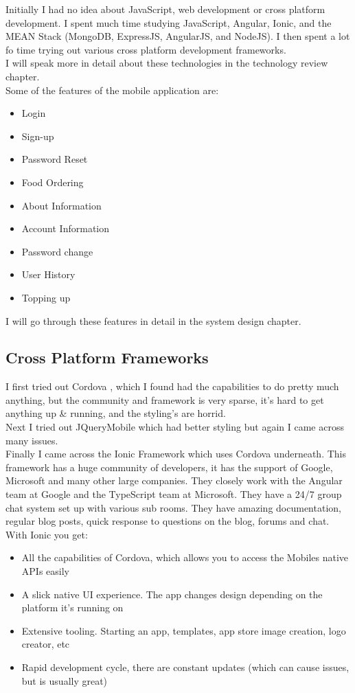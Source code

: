 Initially I had no idea about JavaScript, web development or cross platform development. I spent much time studying JavaScript, Angular, Ionic, and the MEAN Stack (MongoDB, ExpressJS, AngularJS, and NodeJS). I then spent a lot fo time trying out various cross platform development frameworks.
\\

I will speak more in detail about these technologies in the technology review chapter.
\\

Some of the features of the mobile application are:
\begin{itemize}
\item Login
\item Sign-up
\item Password Reset
\item Food Ordering
\item About Information
\item Account Information
\item Password change
\item User History
\item Topping up
\end{itemize}
I will go through these features in detail in the system design chapter.

\subsection{Cross Platform Frameworks}
I first tried out Cordova \cite{cordova}, which I found had the capabilities to do pretty much anything, but the community and framework is very sparse, it's hard to get anything up \& running, and the styling's are horrid.
\\

Next I tried out JQueryMobile \cite{jquery_mobile} which had better styling but again I came across many issues.
\\

Finally I came across the Ionic Framework \cite{ionic} which uses Cordova underneath. This framework has a huge community of developers, it has the support of Google, Microsoft and many other large companies. They closely work with the Angular team at Google and the TypeScript team at Microsoft. 
They have a 24/7 group chat system set up with various sub rooms. 
They have amazing documentation, regular blog posts, quick response to questions on the blog, forums and chat. 
With Ionic you get:
\begin{itemize}
\item All the capabilities of Cordova, which allows you to access the Mobiles native APIs easily
\item A slick native UI experience. The app changes design depending on the platform it's running on
\item Extensive tooling. Starting an app, templates, app store image creation, logo creator, etc
\item Rapid development cycle, there are constant updates (which can cause issues, but is usually great)
\end{itemize}

